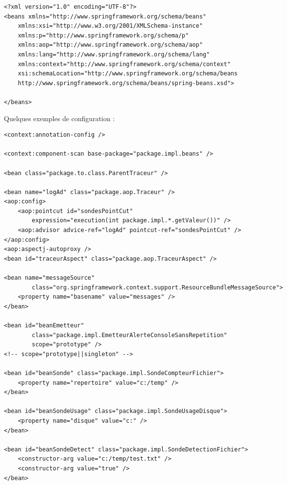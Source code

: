 \documentclass[11pt,twoside,a4paper]{article}
\begin{document}
\begin{landscape}
\begin{multicols}{2}
	\footnotesize
	\begin{verbatim}
<?xml version="1.0" encoding="UTF-8"?>
<beans xmlns="http://www.springframework.org/schema/beans"
    xmlns:xsi="http://www.w3.org/2001/XMLSchema-instance"
    xmlns:p="http://www.springframework.org/schema/p"
    xmlns:aop="http://www.springframework.org/schema/aop"
    xmlns:lang="http://www.springframework.org/schema/lang"
    xmlns:context="http://www.springframework.org/schema/context"
    xsi:schemaLocation="http://www.springframework.org/schema/beans
    http://www.springframework.org/schema/beans/spring-beans.xsd">

</beans>
	\end{verbatim}
	\normalsize
	
	
Quelques exemples de configuration : 
	
	\footnotesize
	\begin{verbatim}
<context:annotation-config />

<context:component-scan base-package="package.impl.beans" />

<bean class="package.to.class.ParentTraceur" />

<bean name="logAd" class="package.aop.Traceur" />
<aop:config>
    <aop:pointcut id="sondesPointCut" 
        expression="execution(int package.impl.*.getValeur())" />
    <aop:advisor advice-ref="logAd" pointcut-ref="sondesPointCut" />
</aop:config>
<aop:aspectj-autoproxy />
<bean id="traceurAspect" class="package.aop.TraceurAspect" />

<bean name="messageSource"
        class="org.springframework.context.support.ResourceBundleMessageSource">
    <property name="basename" value="messages" />
</bean>

<bean id="beanEmetteur" 
        class="package.impl.EmetteurAlerteConsoleSansRepetition" 
        scope="prototype" />
<!-- scope="prototype||singleton" -->

<bean id="beanSonde" class="package.impl.SondeCompteurFichier">
    <property name="repertoire" value="c:/temp" />
</bean>

<bean id="beanSondeUsage" class="package.impl.SondeUsageDisque">
    <property name="disque" value="c:" />
</bean>

<bean id="beanSondeDetect" class="package.impl.SondeDetectionFichier">
    <constructor-arg value="c:/temp/test.txt" />
    <constructor-arg value="true" />
</bean>


\end{verbatim}
\end{multicols}
\end{landscape}
\end{document}
